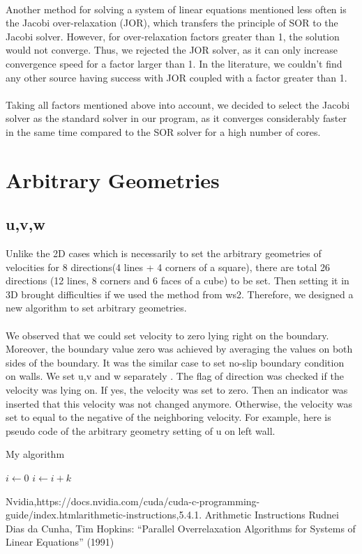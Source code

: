 \documentclass{article}%
\begin{document}
\\
Another method for solving a system of linear equations mentioned less often is the Jacobi over-relaxation (JOR), which transfers the principle of SOR to the Jacobi solver. However, for over-relaxation factors greater than 1, the solution would not converge. Thus, we rejected the JOR solver, as it can only increase convergence speed for a factor larger than 1. In the literature, we couldn’t find any other source having success with JOR coupled with a factor greater than 1.\\
\\
Taking all factors mentioned above into account, we decided to select the Jacobi solver as the standard solver in our program, as it converges considerably faster in the same time compared to the SOR solver for a high number of cores.
\section{Arbitrary Geometries}
\subsection{u,v,w}
Unlike the 2D cases which is necessarily to set the arbitrary geometries of velocities for 8 directions(4 lines + 4 corners of a square), there are total 26 directions (12 lines, 8 corners and 6 faces of a cube) to be set. Then setting it in 3D brought difficulties if we used the method from ws2.  Therefore, we designed a new algorithm to set arbitrary geometries.\\
\\
We observed that we could set velocity to zero lying right on the boundary. Moreover, the boundary value zero was achieved by averaging the values on both sides of the boundary. It was the similar case to set no-slip boundary condition on walls.  We set u,v and w separately . The flag of direction was checked if the velocity was lying on. If yes, the velocity was set to zero. Then an indicator was inserted that this velocity was not changed anymore. Otherwise, the velocity was set to equal to the negative of the neighboring velocity.  For example, here is pseudo code of the arbitrary geometry setting of u on left wall.
\begin{algorithm}
\caption{My algorithm}\label{euclid}
\begin{algorithmic}
    \State $i\gets 0$
\Else
        \State $i\gets i+k$
    \EndIf
\EndIf
\end{algorithmic}
\end{algorithm}

\begin{thebibliography}{999}

Nvidia,https://docs.nvidia.com/cuda/cuda-c-programming-guide/index.html\text{\#}arithmetic-instructions,5.4.1. Arithmetic Instructions
Rudnei Dias da Cunha, Tim Hopkins: “Parallel Overrelaxation Algorithms for Systems of Linear Equations” (1991)
\end{thebibliography}
\end{document}
